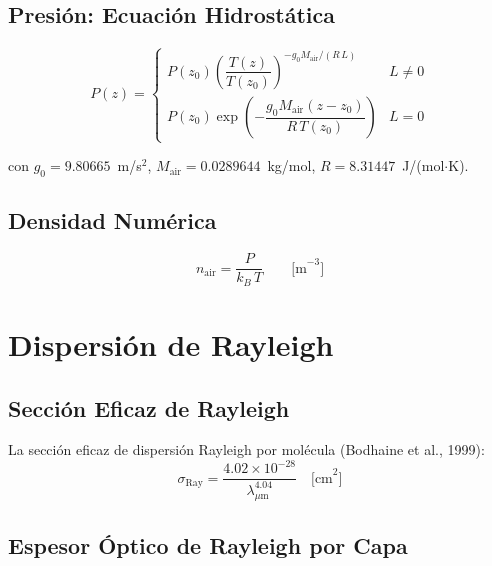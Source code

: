 \documentclass[a4paper,11pt]{article}
\begin{document}
\subsection{Presi\'on: Ecuaci\'on Hidrost\'atica}

\begin{equation}
    P(z) = \begin{cases}
        P(z_0)\left(\dfrac{T(z)}{T(z_0)}\right)^{-g_0 M_{\text{air}}/(R\,L)}
        & L \neq 0 \\[8pt]
        P(z_0)\exp\!\left(-\dfrac{g_0 M_{\text{air}}(z-z_0)}{R\,T(z_0)}\right)
        & L = 0
    \end{cases}
\end{equation}

con $g_0 = 9.80665$~m/s$^2$, $M_{\text{air}} = 0.0289644$~kg/mol,
$R = 8.31447$~J/(mol$\cdot$K).

\subsection{Densidad Num\'erica}

\begin{equation}
    n_{\text{air}} = \frac{P}{k_B\,T} \qquad\text{[m}^{-3}\text{]}
\end{equation}


\section{Dispersi\'on de Rayleigh}\label{sec:rayleigh}

\subsection{Secci\'on Eficaz de Rayleigh}

La secci\'on eficaz de dispersi\'on Rayleigh por mol\'ecula
(Bodhaine et al., 1999):
\begin{equation}
    \sigma_{\text{Ray}} = \frac{4.02\times 10^{-28}}{\lambda_{\mu\text{m}}^{4.04}}
    \quad\text{[cm}^2\text{]}
\end{equation}

\subsection{Espesor \'Optico de Rayleigh por Capa}
\end{document}
